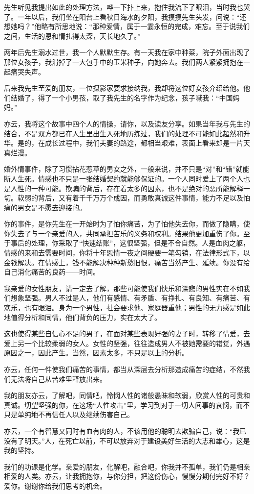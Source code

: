 \par 先生听见我提出如此的处理方法，哗一下扑上来，抱住我流下了眼泪，当时我也哭了。一年以后，我们坐在阳台上看秋日海水的夕阳，我摸摸先生头发，问说：“还想她吗？”他略有所思地说：“那种爱情，属于一霎永恒的完成，难忘。至于说我们之间，生活的恩和情扎得太深，天长地久了。”
\par 两年后先生溺水过世，我一个人默默生存。有一天我在家中种菜，院子外面出现了那位女孩子，我滑掉了一大包手中的玉米种子，向她奔去。我们两人紧紧拥抱在一起痛哭失声。
\par 后来我先生至爱的朋友，一位摄影家要求接纳我，我却将这位好女孩介绍给他。他们结婚了，得了一个小男孩，取了我先生的名字作为纪念，孩子喊我：“中国妈妈。”
\par 亦云，我将这个故事中四个人的情操，请你，以及读友分享。如果当年我与先生的结合，不是双方都已在人生里出生入死地历练过，我们的处理不可能如此超然和升华。是的，在成长过程中，我们夫妻的路途，都相当艰难，表面上看来却是一片天真烂漫。
\par 婚外情事件，除了习惯拈花惹草的男女之外，一般来说，并不只是“对”和“错”就能断人生死。情感也不只是一张结婚契约就能够保证的。一个人同时爱上了两个人也是人性的一种可能。欺骗的背后，存在着太多的因素，也不是绝对的恶所能解释一切。软弱的背后，又有着千千万万个成因，而勇敢真诚这件事情，能力不足以及怕痛的男女是不愿去迎接的。
\par 你的事件，是你先生在一开始时为了怕你痛苦，为了怕他失去你，而做了隐瞒，使你失去了与一个亲爱的人，共同承担苦乐的义务和权利。结果他更加重伤了你。至于事后的处理，你采取了“快速结账”，这很坚强，但是不合自然。人是血肉之躯，情感的来和去需要时间，你将十年恩情一夜之间硬要一笔勾销，在法律形式下，以金钱解决。在情感上，钱不能解决种种新愁旧恨，痛苦当然产生、延续。你没有给自己消化痛苦的良药——时间。
\par 我亲爱的女性朋友，请一定去了解，那些可能使我们快乐和深悲的男性实在不如我们想象坚强。男人不过是人，他们有感情、有矛盾、有挣扎、有良知、有痛苦、有欢乐，也有眼泪。身为一个男性，社会要求他、家庭器重他；男性的无力感是如此地值得分析和同情，他们背负的压力，实在太大了。
\par 这也使得某些自信心不足的男子，在面对某些表现好强的妻子时，转移了情爱，去爱上另一个比较柔弱的女人。女性的坚强，往往造成男人不被她需要的错觉，外遇原因之一，因此产生。当然，因素太多，不只是以上的分析。
\par 亦云，任何一件使我们痛苦的事情，都当从深层去分析那造成痛苦的症结，不然我们无法将自己从苦难里释放出来。
\par 我的朋友亦云，了解吧，同情吧，怜悯人性的诸般愚昧和软弱，欣赏人性的可贵和真诚。切望坚强的你，在这场“人性攻击”里，学习到对于一切人间事的哀悯，而不只是单纯地不再信任人以及继续伤害自己。
\par 亦云，一个有智慧又同时有血有肉的人，不该用他的聪明去欺骗自己，说：“我已没有了明天。”人，在死亡以前，不可以放弃对于建设美好生活的大志和雄心，这是我的坚持。
\par 我们的功课是化学。亲爱的朋友，化解吧，融合吧，你我并不孤单，我们仍是相亲相爱的人类。亦云，让我拥抱你，与你分担，把这份伤心，慢慢分期付完好不好？爱你。谢谢你给我们思考的机会。
\par {}

